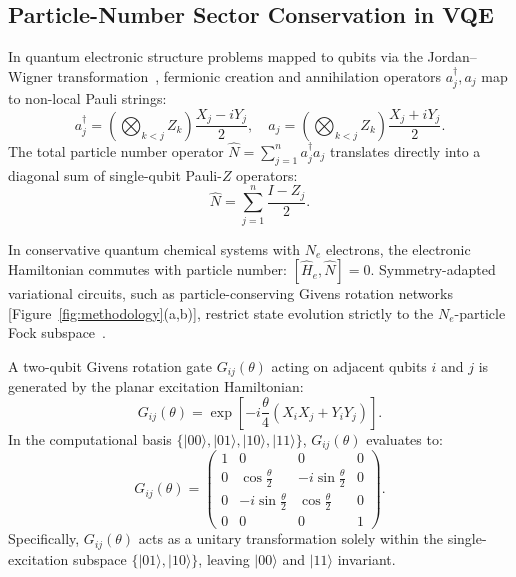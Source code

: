 \documentclass[aps,pra,reprint,superscriptaddress,floatfix,nofootinbib]{revtex4-2}
\begin{document}
\subsection{Particle-Number Sector Conservation in VQE}
In quantum electronic structure problems mapped to qubits via the Jordan--Wigner transformation~\cite{Jordan1928, Ortiz2001}, fermionic creation and annihilation operators $a_j^\dagger, a_j$ map to non-local Pauli strings:
\begin{equation}
a_j^\dagger = \left( \bigotimes_{k < j} Z_k \right) \frac{X_j - i Y_j}{2}, \quad a_j = \left( \bigotimes_{k < j} Z_k \right) \frac{X_j + i Y_j}{2}.
\end{equation}
The total particle number operator $\hat{N} = \sum_{j=1}^n a_j^\dagger a_j$ translates directly into a diagonal sum of single-qubit Pauli-$Z$ operators:
\begin{equation}
\hat{N} = \sum_{j=1}^n \frac{I - Z_j}{2}.
\label{eq:number_op}
\end{equation}

In conservative quantum chemical systems with $N_e$ electrons, the electronic Hamiltonian commutes with particle number: $[\hat{H}_e, \hat{N}] = 0$. Symmetry-adapted variational circuits, such as particle-conserving Givens rotation networks [Figure~\ref{fig:methodology}(a,b)], restrict state evolution strictly to the $N_e$-particle Fock subspace~\cite{Barkoutsos2018, Wecker2015}.

A two-qubit Givens rotation gate $G_{ij}(\theta)$ acting on adjacent qubits $i$ and $j$ is generated by the planar excitation Hamiltonian:
\begin{equation}
G_{ij}(\theta) = \exp\left[ -i \frac{\theta}{4} (X_i X_j + Y_i Y_j) \right].
\end{equation}
In the computational basis $\{|00\rangle, |01\rangle, |10\rangle, |11\rangle\}$, $G_{ij}(\theta)$ evaluates to:
\begin{equation}
G_{ij}(\theta) = \begin{pmatrix}
1 & 0 & 0 & 0 \\
0 & \cos\frac{\theta}{2} & -i\sin\frac{\theta}{2} & 0 \\
0 & -i\sin\frac{\theta}{2} & \cos\frac{\theta}{2} & 0 \\
0 & 0 & 0 & 1
\end{pmatrix}.
\end{equation}
Specifically, $G_{ij}(\theta)$ acts as a unitary transformation solely within the single-excitation subspace $\{|01\rangle, |10\rangle\}$, leaving $|00\rangle$ and $|11\rangle$ invariant.
\end{document}
